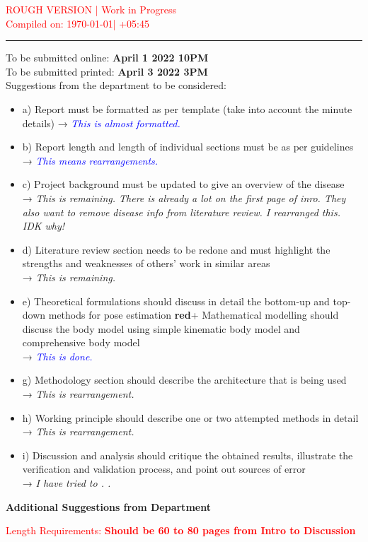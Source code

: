 \newpage

\begin{center}
\vspace{1cm}
\textcolor{red}{ROUGH VERSION | Work in Progress \\
Compiled on: \today | \DTMcurrenttime  +05:45} 
\noindent\rule{8cm}{0.4pt}
\end{center}
To be submitted online: \textbf{ April 1 2022  10PM} \\
To be submitted printed: \textbf{ April 3 2022  3PM} \\

Suggestions from the department to be considered:
\begin{itemize}
    \item a) Report must be formatted as per template (take into account the minute details) → \textit{\textcolor{blue}{ This is almost formatted.}}
    
    \item b) Report length and length of individual sections must be as per guidelines \\→ \textit{\textcolor{blue}{This means rearrangements.}}
    
    \item c) Project background must be updated to give an overview of the disease\\→ \textit{This is remaining. There is already a lot on the first page of inro. They also want to remove disease info from literature review. I rearranged this. IDK why!}
    
    \item d)  Literature review section needs to be redone and must highlight the strengths and weaknesses of others' work in similar areas\\→ \textit{This is remaining.}
    \item e) Theoretical formulations should discuss in detail the bottom-up and top-down methods for pose estimation \textbf{red}{+} Mathematical modelling should discuss the body model using simple kinematic body model and comprehensive body model\\→ \textit{\textcolor{blue}{This is done.}}
    
    \item g) Methodology section should describe the architecture that is being used\\→ \textit{This is rearrangement.}
    
    \item h) Working principle should describe one or two attempted methods in detail\\→ \textit{This is rearrangement.}
    
    \item i) Discussion and analysis should critique the obtained results, illustrate the verification and validation process, and point out sources of error\\→ \textit{I have tried to . . }

\end{itemize}






\textbf{Additional Suggestions from Department}

\textcolor{red}{
Length Requirements: \textbf{Should be 60 to 80 pages from Intro to Discussion}}